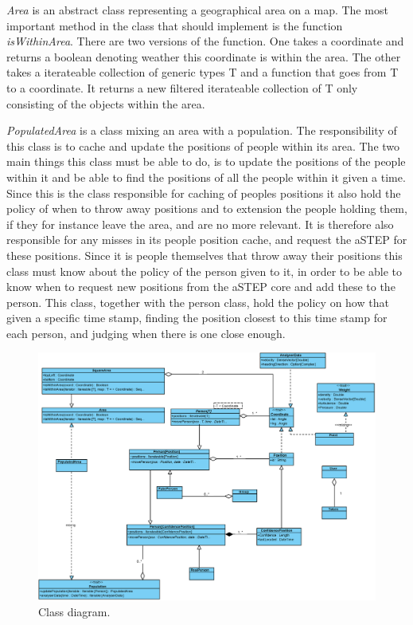 \emph{Area} is an abstract class representing a geographical area on a map. The most important method in the class that should implement is the function \emph{isWithinArea}. There are two versions of the function. One takes a coordinate and returns a boolean denoting weather this coordinate is within the area. The other takes a iterateable collection of generic types T and a function that goes from T to a coordinate. It returns a new filtered iterateable collection of T only consisting of the objects within the area.

\emph{PopulatedArea} is a class mixing an area with a population. The responsibility of this class is to cache and update the positions of people within its area. The two main things this class must be able to do, is to update the positions of the people within it and be able to find the positions of all the people within it given a time. Since this is the class responsible for caching of peoples positions it also hold the policy of when to throw away positions and to extension the people holding them, if they for instance leave the area, and are no more relevant. It is therefore also responsible for any misses in its people position cache, and request the aSTEP for these positions. Since it is people themselves that throw away their positions this class must know about the policy of the person given to it, in order to be able to know when to request new positions from the aSTEP core and add these to the person. This class, together with the person class, hold the policy on how that given a specific time stamp, finding the position closest to this time stamp for each person, and judging when there is one close enough.

\begin{figure}
\centering
\includegraphics[width=\linewidth]{figures/class.eps}
\caption{Class diagram.}
\label{fig:class}
\end{figure}

